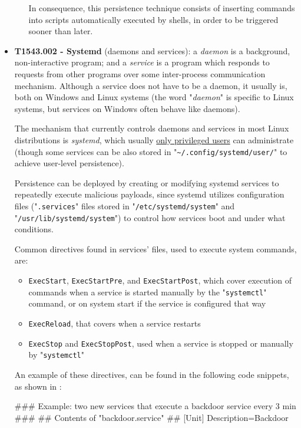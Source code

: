 \begin{itemize}
\begin{itemize}
In consequence, this persistence technique consists of inserting commands into scripts automatically executed by shells, in order to be triggered sooner than later.
\end{itemize}

\item \textbf{T1543.002 - Systemd} (daemons and services): a \textit{daemon} is a background, non-interactive program; and a \textit{service} is a program which responds to requests from other programs over some inter-process communication mechanism. Although a service does not have to be a daemon, it usually is, both on Windows and Linux systems (the word "\textit{daemon}" is specific to Linux systems, but services on Windows often behave like daemons). 

The mechanism that currently controls daemons and services in most Linux distributions is \textit{systemd}, which usually \underline{only privileged users} can administrate (though some services can be also stored in "\verb|~/.config/systemd/user/|" to achieve user-level persistence).

Persistence can be deployed by creating or modifying systemd services to repeatedly execute malicious payloads, since systemd utilizes configuration files ("\texttt{.services}" files stored in "\verb|/etc/systemd/system|" and "\verb|/usr/lib/systemd/system|") to control how services boot and under what conditions. 

\pagebreak
Common directives found in services' files\cite{MitreSystemD}, used to execute system commands, are:
\begin{itemize}
\item \texttt{ExecStart}, \texttt{ExecStartPre}, and \texttt{ExecStartPost}, which cover execution of commands when a service is started manually by the "\texttt{systemctl}" command, or on system start if the service is configured that way
\item \texttt{ExecReload}, that covers when a service restarts
\item \texttt{ExecStop} and \texttt{ExecStopPost}, used when a service is stopped or manually by "\texttt{systemctl}"
\end{itemize}

An example of these directives, can be found in the following code snippets, as shown in \cite{SystemDCode}:

\vspace{7pt}
\begin{spverbatim}
### Example: two new services that execute a backdoor service every 3 min ###
## Contents of "backdoor.service" ##
[Unit]
Description=Backdoor


\end{spverbatim}
\end{itemize}
